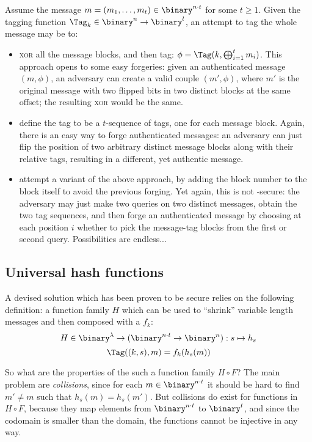Assume the message $m = (m_1, \dots, m_t) \in \binary^{n \cdot t}$ for some $t \geq 1$. Given the tagging function $\Tag_k \in \binary^n \to \binary^l$, an attempt to tag the whole message may be to:

\begin{itemize}    
    \item \textsc{xor} all the message blocks, and then tag: $\phi = \Tag(k, \bigxor_{i = 1}^{t} m_i)$. This approach opens to some easy forgeries: given an authenticated message $(m, \phi)$, an adversary can create a valid couple $(m', \phi)$, where $m'$ is the original message with two flipped bits in two distinct blocks at the same offset; the resulting \textsc{xor} would be the same.

    \item define the tag to be a $t$-sequence of tags, one for each message block. Again, there is an easy way to forge authenticated messages: an adversary can just flip the position of two arbitrary distinct message blocks along with their relative tags, resulting in a different, yet authentic message.

    \item attempt a variant of the above approach, by adding the block number to the block itself to avoid the previous forging. Yet again, this is not \ufcma-secure: the adversary may just make two queries on two distinct messages, obtain the two tag sequences, and then forge an authenticated message by choosing at each position $i$ whether to pick the message-tag blocks from the first or second query. Possibilities are endless...

\end{itemize}

\subsection{Universal hash functions}

A devised solution which has been proven to be secure relies on the following definition: a function family $H$ which can be used to ``shrink'' variable length messages and then composed with a \prf{} $f_k$:
\[
   H \in \binary^\lambda \to (\binary^{n \cdot t} \to \binary^n) : s \mapsto h_s
\]
\[
    \Tag((k, s), m) = f_k(h_s(m))
\]

So what are the properties of the such a function family $H \circ F$? The main problem are \emph{collisions}, since for each $m \in \binary^{n \cdot t}$ it should be hard to find $m' \neq m$ such that $h_s(m) = h_s(m')$. But collisions do exist for functions in $H \circ F$, because they map elements from $\binary^{n \cdot t} $ to $\binary^t$, and since the codomain is smaller than the domain, the functions cannot be injective in any way.

